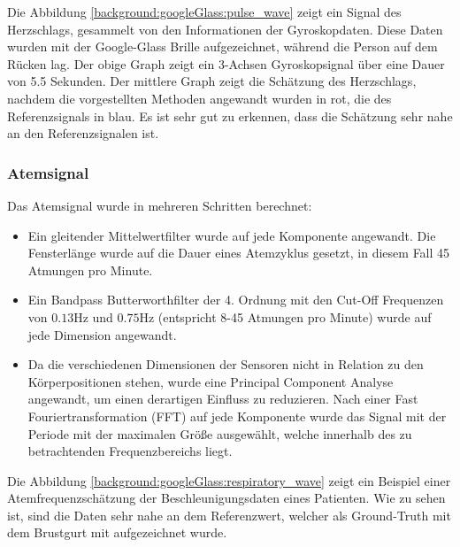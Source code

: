 Die Abbildung \ref{background:googleGlass:pulse_wave} zeigt ein Signal des Herzschlags, gesammelt von den Informationen der Gyroskopdaten. Diese Daten wurden mit der Google-Glass Brille aufgezeichnet, während die Person auf dem Rücken lag. Der obige Graph zeigt ein 3-Achsen Gyroskopsignal über eine Dauer von 5.5 Sekunden. Der mittlere Graph zeigt die Schätzung des Herzschlags, nachdem die vorgestellten Methoden angewandt wurden in rot, die des Referenzsignals in blau. Es ist sehr gut zu erkennen, dass die Schätzung sehr nahe an den Referenzsignalen ist.

\subsubsection{Atemsignal}
Das Atemsignal wurde in mehreren Schritten berechnet:
\begin{itemize}
    \item Ein gleitender Mittelwertfilter wurde auf jede Komponente angewandt. Die Fensterlänge wurde auf die Dauer eines Atemzyklus gesetzt, in diesem Fall 45 Atmungen pro Minute. 
    \item Ein Bandpass Butterworthfilter der 4. Ordnung mit den Cut-Off Frequenzen von $0.13 \si{\hertz}$ und $0.75 \si{\hertz}$ (entspricht 8-45 Atmungen pro Minute) wurde auf jede Dimension angewandt.
    \item Da die verschiedenen Dimensionen der Sensoren nicht in Relation zu den Körperpositionen stehen, wurde eine Principal Component Analyse angewandt, um einen derartigen Einfluss zu reduzieren. Nach einer Fast Fouriertransformation (FFT) auf jede Komponente wurde das Signal mit der Periode mit der maximalen Größe ausgewählt, welche innerhalb des zu betrachtenden Frequenzbereichs liegt.
\end{itemize}

Die Abbildung \ref{background:googleGlass:respiratory_wave} zeigt ein Beispiel einer Atemfrequenzschätzung der Beschleunigungsdaten eines Patienten. Wie zu sehen ist, sind die Daten sehr nahe an dem Referenzwert, welcher als Ground-Truth mit dem Brustgurt mit aufgezeichnet wurde.


